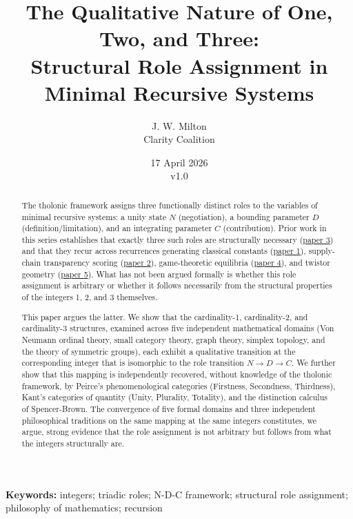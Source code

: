 \documentclass[12pt]{article}
\title{The Qualitative Nature of One, Two, and Three:\\
\large Structural Role Assignment in Minimal Recursive Systems}
\author{J. W. Milton\\[4pt]{\small Clarity Coalition}}
\date{\small 17 April 2026 \\ v1.0}
\begin{document}
\maketitle

\noindent\textbf{Keywords:} integers; triadic roles; N-D-C framework; structural role assignment; philosophy of mathematics; recursion

\begin{abstract}
The tholonic framework assigns three functionally distinct roles to the
variables of minimal recursive systems: a unity state \(N\)
(negotiation), a bounding parameter \(D\) (definition/limitation), and
an integrating parameter \(C\) (contribution). Prior work in this series
establishes that exactly three such roles are structurally necessary
(\href{https://github.com/baardev/truevalue/blob/main/docnav/Research/papers/3_minimal-recursive-triadic-framework/3_minimal-recursive-triadic-framework.pdf}{paper
3}) and that they recur across recurrences generating classical
constants
(\href{https://github.com/baardev/truevalue/blob/main/docnav/Research/papers/1_recursive-tholonic-five-constants/1_recursive-tholonic-five-constants.pdf}{paper
1}), supply-chain transparency scoring
(\href{https://github.com/baardev/truevalue/blob/main/docnav/Research/papers/2_supply-chain-transparency-tvpci/2_supply-chain-transparency-tvpci.pdf}{paper
2}), game-theoretic equilibria
(\href{https://github.com/baardev/truevalue/blob/main/docnav/Research/papers/4_game-theoretic-triadic-balance/4_game-theoretic-triadic-balance.pdf}{paper
4}), and twistor geometry
(\href{https://github.com/baardev/truevalue/blob/main/docnav/Research/papers/5_tholonic-twistor-connection/5_tholonic-twistor-connection.pdf}{paper
5}). What has not been argued formally is whether this role assignment
is arbitrary or whether it follows necessarily from the structural
properties of the integers 1, 2, and 3 themselves.

This paper argues the latter. We show that the cardinality-1,
cardinality-2, and cardinality-3 structures, examined across five
independent mathematical domains (Von Neumann ordinal theory, small
category theory, graph theory, simplex topology, and the theory of
symmetric groups), each exhibit a qualitative transition at the
corresponding integer that is isomorphic to the role transition
\(N \to D \to C\). We further show that this mapping is independently
recovered, without knowledge of the tholonic framework, by Peirce's
phenomenological categories (Firstness, Secondness, Thirdness), Kant's
categories of quantity (Unity, Plurality, Totality), and the distinction
calculus of Spencer-Brown. The convergence of five formal domains and
three independent philosophical traditions on the same mapping at the
same integers constitutes, we argue, strong evidence that the role
assignment is not arbitrary but follows from what the integers
structurally are.


\end{abstract}
\end{document}

